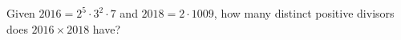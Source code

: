 Given $2016=2^5\cdot3^2\cdot7$ and $2018=2\cdot1009$, how many distinct positive divisors does $2016\times2018$ have?

